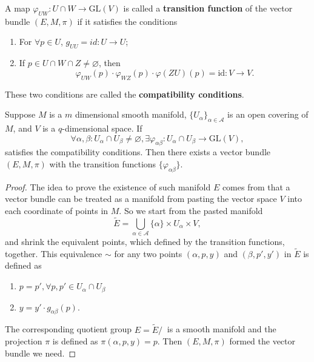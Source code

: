 \begin{definition}
A map $\varphi_{UW}:U\cap W\to \text{GL}(V)$ is called a \textbf{transition function} of the vector bundle $(E,M,\pi)$ if it satisfies the conditions
\begin{enumerate}
\item For $\forall p\in U$, $g_{UU}=id:U\to U$;
\item If $p\in U\cap W\cap Z\ne\varnothing$, then
\begin{equation}
\varphi_{UW}(p)\cdot\varphi_{WZ}(p)\cdot\varphi(ZU)(p)=\text{id}:V\to V.
\end{equation}
\end{enumerate}
These two conditions are called the \textbf{compatibility conditions}.
\end{definition}

\begin{theorem}
Suppose $M$ is a $m$ dimensional smooth manifold, $\{U_\alpha\}_{\alpha\in\mathcal{A}}$ is an open covering of $M$, and $V$ is a $q$-dimensional space. If 
\begin{equation*}
\forall \alpha,\beta: U_\alpha\cap U_\beta\ne\varnothing, \exists \varphi_{\alpha\beta}:U_\alpha\cap U_\beta\to \text{GL}(V),
\end{equation*}
satisfies the compatibility conditions. Then there exists a vector bundle $(E,M,\pi)$ with the transition functions $\{\varphi_{\alpha\beta}\}$.
\end{theorem}

\begin{proof}
The idea to prove the existence of such manifold $E$ comes from that a vector bundle can be treated as a manifold from pasting the vector space $V$ into each coordinate of points in $M$. So we start from the pasted manifold 
\begin{equation*}
\tilde{E}=\bigcup_{\alpha\in\mathcal{A}}\{\alpha\}\times U_\alpha\times V,
\end{equation*} 
and shrink the equivalent points, which defined by the transition functions, together. This equivalence $\sim$ for any two points $(\alpha,p,y)$ and $(\beta,p',y')$ in $\tilde E$ is defined as
\begin{enumerate}
\item $p=p',\forall p,p'\in U_\alpha\cap U_\beta$
\item $y=y'\cdot g_{\alpha\beta}(p)$.
\end{enumerate}
The corresponding quotient group $E=\tilde E/~$ is a smooth manifold and the projection $\pi$ is defined as $\pi(\alpha,p,y)=p$. Then $(E,M,\pi)$ formed the vector bundle we need.
\end{proof}



